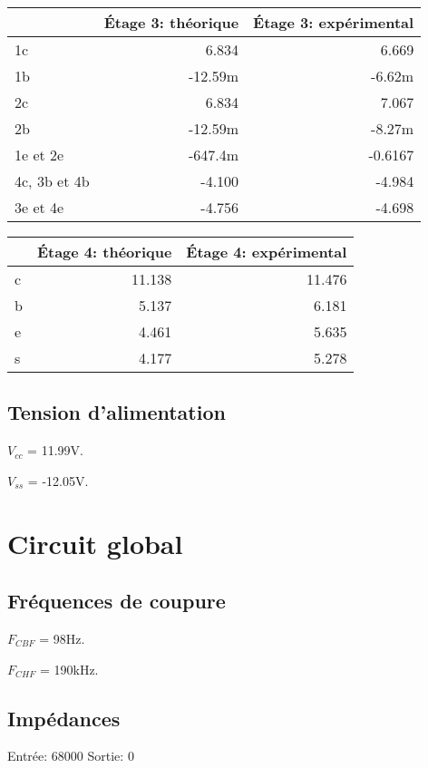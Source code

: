 \begin{tabular}{|l|r|r|}
    \hline
    & Étage 3: théorique & Étage 3: expérimental \\
    \hline
    1c           &   6.834 &   6.669 \\
    \hline
    1b           & -12.59m &  -6.62m \\
    \hline
    2c           &   6.834 &   7.067 \\
    \hline
    2b           & -12.59m &  -8.27m \\
    \hline
    1e et 2e     & -647.4m & -0.6167 \\
    \hline
    4c, 3b et 4b &  -4.100 &  -4.984 \\
    \hline
    3e et 4e     &  -4.756 &  -4.698 \\
    \hline
\end{tabular}
\begin{tabular}{|l|r|r|}
    \hline
    & Étage 4: théorique & Étage 4: expérimental \\
    \hline
    c & 11.138 & 11.476 \\
    \hline
    b &  5.137 & 6.181 \\
    \hline
    e &  4.461 & 5.635 \\
    \hline
    s &  4.177 & 5.278 \\
    \hline
\end{tabular}

\subsection{Tension d’alimentation}
$V_{cc}$ = 11.99V.

$V_{ss}$ = -12.05V.

\section{Circuit global}

\subsection{Fréquences de coupure}
$F_{CBF}$ = 98Hz.

$F_{CHF}$ = 190kHz.

\subsection {Impédances}
Entrée: 68000\ohm
Sortie: 0\ohm %
